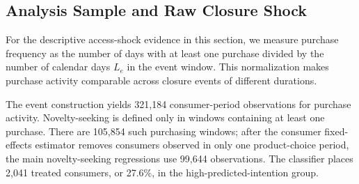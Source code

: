 \documentclass[11 pt]{article}
\begin{document}
\subsection{Analysis Sample and Raw Closure Shock}
\label{section:statistics}

For the descriptive access-shock evidence in this section, we measure purchase frequency as the number of days with at least one purchase divided by the number of calendar days $L_e$ in the event window. This normalization makes purchase activity comparable across closure events of different durations.

The event construction yields 321,184 consumer-period observations for purchase activity. Novelty-seeking is defined only in windows containing at least one purchase. There are 105,854 such purchasing windows; after the consumer fixed-effects estimator removes consumers observed in only one product-choice period, the main novelty-seeking regressions use 99,644 observations. The classifier places 2,041 treated consumers, or 27.6\%, in the high-predicted-intention group.
\end{document}
